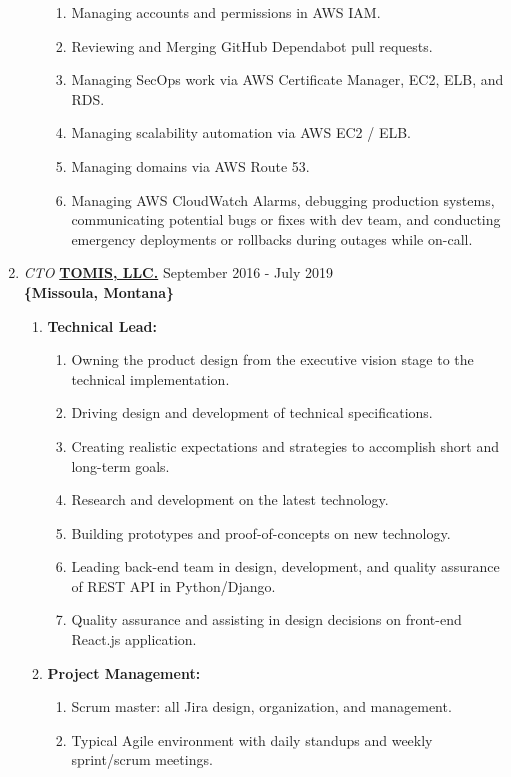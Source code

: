 \documentclass[oneside]{article}%
\begin{document}
\begin{enumerate}[]
\begin{enumerate}[]
\begin{enumerate}[-]
					\item Managing accounts and permissions in AWS IAM.
					\item Reviewing and Merging GitHub Dependabot pull requests.
					\item Managing SecOps work via AWS Certificate Manager, EC2, ELB, and RDS.
					\item Managing scalability automation via AWS EC2 / ELB.
					\item Managing domains via AWS Route 53.
					\item Managing AWS CloudWatch Alarms, debugging production systems, communicating potential bugs or fixes with dev team, and conducting emergency deployments or rollbacks during outages while on-call.
				\end{enumerate}
		\end{enumerate}
	\item \textit{CTO} \textbf{\href{https://tomis.tech}{TOMIS, LLC.}} \hfill September 2016 - July 2019\\
		\textbf{\{Missoula, Montana\}}
		\begin{enumerate}[]
			\item \textbf{Technical Lead:}
				\begin{enumerate}[-]
					\item Owning the product design from the executive vision stage to the technical implementation.
					\item Driving design and development of technical specifications.
					\item Creating realistic expectations and strategies to accomplish short and long-term goals.
					\item Research and development on the latest technology.
					\item Building prototypes and proof-of-concepts on new technology.
					\item Leading back-end team in design, development, and quality assurance of REST API in Python/Django.
					\item Quality assurance and assisting in design decisions on front-end React.js application.
				\end{enumerate}
			\item \textbf{Project Management:}
				\begin{enumerate}[-]
					\item Scrum master: all Jira design, organization, and management.
					\item Typical Agile environment with daily standups and weekly sprint/scrum meetings.

\end{enumerate}
\end{enumerate}
\end{enumerate}
\end{document}
